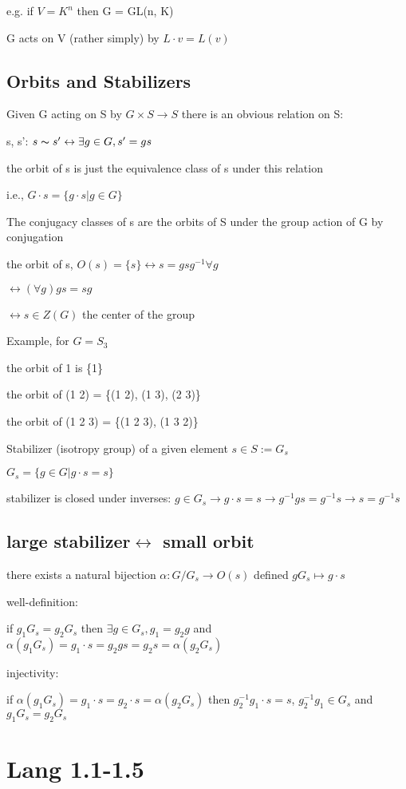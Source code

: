 \documentclass[12pt]{article}
\begin{document}
e.g. if $V = K^n$ then G = GL(n, K)

G acts on V (rather simply) by $L \cdot v = L(v)$

\subsection{Orbits and Stabilizers}

\noindent
Given G acting on S by $G \times S \to S$ there is an obvious relation on S:

s, s': $s \thicksim s' \leftrightarrow \exists g \in G, s' = gs $

the orbit of s is just the equivalence class of s under this relation

i.e., $G \cdot s = \{g \cdot s | g \in G\}$

\noindent
The conjugacy classes of s are the orbits of S under the group action of G by conjugation

the orbit of s, $O(s) = \{s\} \leftrightarrow s = gsg^{-1} \forall g$

$\leftrightarrow (\forall g)gs = sg$

$\leftrightarrow s \in Z(G)$ the center of the group

\noindent
Example, for $G = S_3$

the orbit of 1 is \{1\}

the orbit of (1 2) = \{(1 2), (1 3), (2 3)\}

the orbit of (1 2 3) = \{(1 2 3), (1 3 2)\}

\noindent
Stabilizer (isotropy group) of a given element $s \in S := G_s$

$G_s = \{g \in G |g \cdot s = s\}$

stabilizer is closed under inverses: $g \in G_s \to g \cdot s = s \to g^{-1}gs = g^{-1}s \to s = g^{-1}s$

\subsection{large stabilizer$\leftrightarrow$ small orbit}

\noindent
there exists a natural bijection $\alpha: G/G_s \to O(s)$ defined $gG_s \mapsto g \cdot s$


\noindent
well-definition:

if $g_1G_s = g_2G_s$
then $\exists g \in G_s, g_1 = g_2g$
and $\alpha(g_1G_s) = g_1 \cdot s = g_2 g s = g_2 s = \alpha(g_2G_s)$

\noindent
injectivity:

if $\alpha(g_1G_s) = g_1 \cdot s = g_2 \cdot s = \alpha(g_2G_s)$
then $g_2^{-1}g_1 \cdot s = s$, $g_2^{-1}g_1 \in G_s$ and $g_1G_s = g_2G_s$

\section{Lang 1.1-1.5}
\end{document}
